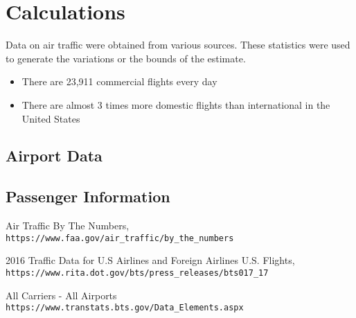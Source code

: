 \documentclass[11pt]{article}
\begin{document}
	\section{Calculations}
	Data on air traffic were obtained from various sources. These statistics were used to generate the variations or the bounds of the estimate.

		\begin{itemize}

			\item There are 23,911 commercial flights every day \cite{faa}

			\item There are almost 3 times more domestic flights than international in the United States \cite{domvsintl}

		\end{itemize}

		\subsection{Airport Data}

		\subsection{Passenger Information}


	\begin{thebibliography}{9}

		Air Traffic By The Numbers,
		\\\texttt{https://www.faa.gov/air\_{}traffic/by\_{}the\_{}numbers}

		2016 Traffic Data for U.S Airlines and Foreign Airlines U.S. Flights,
		\\\texttt{https://www.rita.dot.gov/bts/press\_{}releases/bts017\_{}17}

		All Carriers - All Airports
		\\\texttt{https://www.transtats.bts.gov/Data\_{}Elements.aspx}


	\end{thebibliography}
\end{document}

